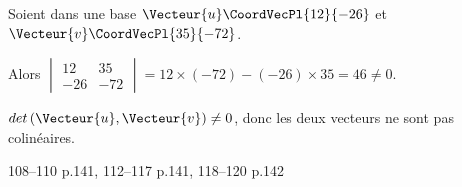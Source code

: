 \documentclass[a4paper]{article}
\begin{document}
\begin{example}{}{}

  Soient dans une base $\Vecteur{u}\CoordVecPl{12}{-26}$ et $\Vecteur{v}\CoordVecPl{35}{-72}$.

  Alors $\begin{vmatrix} 
    12 & 35 \\ 
    -26 & -72 
    \end{vmatrix} = 12\times(-72)-(-26)\times 35=46\neq 0$.

    $det\left(\Vecteur{u},\Vecteur{v}\right)\neq 0$,
      donc les deux vecteurs ne sont pas colinéaires.
\end{example}

\begin{exercices}{}{}
  108--110 p.141, 112--117 p.141, 118--120 p.142
\end{exercices}


  
\end{document}
